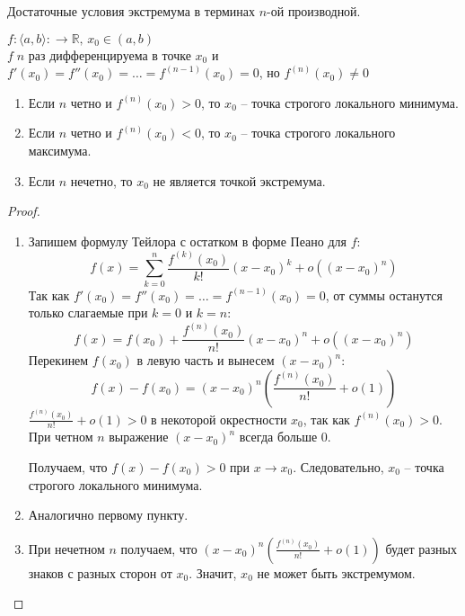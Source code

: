 \begin{theorem-non}
    Достаточные условия экстремума в терминах $n$-ой производной.

    $f: \langle a, b \rangle: \to \mathbb{R}, \, x_0 \in (a, b)$ \\
    $f \; n$ раз дифференцируема в точке $x_0$ и $f'(x_0) = f''(x_0) = \dots = f^{(n - 1)}(x_0) = 0$, но $f^{(n)}(x_0) \neq 0$
    \begin{enumerate}
        \item Если $n$ четно и $f^{(n)}(x_0) > 0$, то $x_0$ -- точка строгого локального минимума.
        \item Если $n$ четно и $f^{(n)}(x_0) < 0$, то $x_0$ -- точка строгого локального максимума.
        \item Если $n$ нечетно, то $x_0$ не является точкой экстремума. 
    \end{enumerate}
\end{theorem-non}

\begin{proof} $\quad$ \\
    \begin{enumerate} 
        \item Запишем формулу Тейлора с остатком в форме Пеано для $f$: 
        \[ f(x) = \sum_{k = 0}^n \frac{f^{(k)}(x_0)}{k!} (x - x_0)^k + o((x - x_0)^n) \]
        Так как $f'(x_0) = f''(x_0) = \dots = f^{(n - 1)}(x_0) = 0$, от суммы останутся только слагаемые при $k = 0$ и $k = n$: 
        \[ f(x) = f(x_0) + \frac{f^{(n)}(x_0)}{n!} (x - x_0)^n + o((x - x_0)^n) \]
        Перекинем $f(x_0)$ в левую часть и вынесем $(x - x_0)^n$: \[ f(x) - f(x_0) = (x - x_0)^n(\frac{f^{(n)}(x_0)}{n!} + o(1)) \]
        $\frac{f^{(n)}(x_0)}{n!} + o(1) > 0$ в некоторой окрестности $x_0$, так как $f^{(n)}(x_0) > 0$. 
        При четном $n$ выражение $(x - x_0)^n$ всегда больше 0. 
        
        Получаем, что $f(x) - f(x_0) > 0$ при $x \to x_0$. Следовательно, $x_0$ -- точка строгого локального минимума.
        \item Аналогично первому пункту.
        \item При нечетном $n$ получаем, что $(x - x_0)^n(\frac{f^{(n)}(x_0)}{n!} + o(1))$ будет разных знаков с разных сторон от $x_0$. 
        Значит, $x_0$ не может быть экстремумом. 
    \end{enumerate}
\end{proof}
